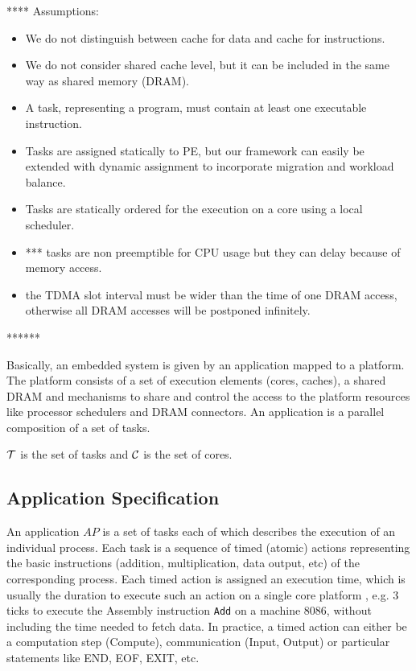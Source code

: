 
****
Assumptions:
\begin{itemize}
\item We do not distinguish between cache for data and cache for instructions.
\item We do not consider shared cache level, but it can be included in the same way as shared memory (DRAM).
\item A task, representing a program, must contain at least one executable instruction.
\item Tasks are assigned statically to PE, but our framework can easily be extended with dynamic assignment to incorporate migration and workload balance.
\item Tasks are statically ordered for the execution on a core using a local scheduler. 
\item *** tasks are non preemptible for CPU usage but they can delay because of memory access. 
\item the TDMA slot interval must be wider than the time of one DRAM access, otherwise all DRAM accesses will be postponed infinitely.
\end{itemize}

******

Basically, an embedded system is given by an application mapped to a platform. The platform consists of a set of execution elements (cores, caches), a shared DRAM and mechanisms to share and control the access to the platform resources like processor schedulers and DRAM connectors. An application is a parallel composition of a set of tasks.

${\cal T}$ is the set of tasks and ${\cal C}$ is the set of cores.

\subsection{Application Specification}


An application $AP$ is a set of tasks each of which describes the execution of an individual process. Each task is a sequence of timed (atomic) actions representing the basic instructions (addition, multiplication, data output, etc) of the corresponding process.
Each timed action is assigned an execution time, which is usually the duration to execute such an action on a single core platform , e.g. 3 ticks to execute the Assembly instruction \texttt{Add} on a machine 8086, without including the time needed to fetch data.  In practice, a timed action can either be a computation step (Compute), communication (Input, Output) or particular statements like END, EOF, EXIT, etc. 

